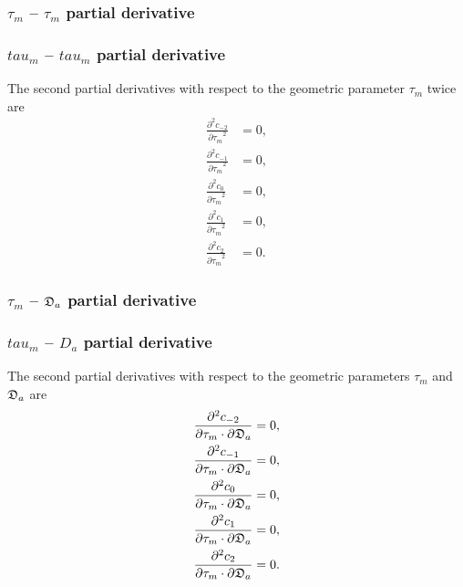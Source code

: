 \begin{latexonly}
    \subsubsection{$\tau_m$ -- $\tau_m$ partial derivative}
\end{latexonly}
\begin{htmlonly}
    \subsubsection{$tau_m$ -- $tau_m$ partial derivative}
\end{htmlonly}

The second partial derivatives with respect to the geometric parameter $\tau_m$ twice are
\begin{subequations}
\begin{align}
    \frac{\partial^2 c_{-2}}{{\partial \tau_m}^2}  &=  0, \\
    \frac{\partial^2 c_{-1}}{{\partial \tau_m}^2} &= 0, \\
    \frac{\partial^2 c_{0}}{{\partial \tau_m}^2}  &= 0, \\
    \frac{\partial^2 c_{1}}{{\partial \tau_m}^2}  &= 0, \\
    \frac{\partial^2 c_{2}}{{\partial \tau_m}^2}  &= 0.
\end{align}
\end{subequations}



\begin{latexonly}
    \subsubsection{$\tau_m$ -- $\mathfrak{D}_a$ partial derivative}
\end{latexonly}
\begin{htmlonly}
    \subsubsection{$tau_m$ -- $D_a$ partial derivative}
\end{htmlonly}

The second partial derivatives with respect to the geometric parameters $\tau_m$ and $\mathfrak{D}_a$ are
\begin{subequations}
\begin{align}
    \frac{\partial^2 c_{-2}}{\partial \tau_m \cdot \partial \mathfrak{D}_a}  &=  0, \\
    \frac{\partial^2 c_{-1}}{\partial \tau_m \cdot \partial \mathfrak{D}_a} &= 0, \\
    \frac{\partial^2 c_{0}}{\partial \tau_m \cdot \partial \mathfrak{D}_a}  &= 0, \\
    \frac{\partial^2 c_{1}}{\partial \tau_m \cdot \partial \mathfrak{D}_a}  &= 0, \\
    \frac{\partial^2 c_{2}}{\partial \tau_m \cdot \partial \mathfrak{D}_a}  &= 0.
\end{align}
\end{subequations}



